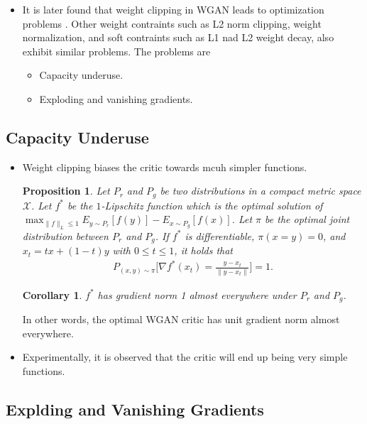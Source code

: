 \documentclass[10pt]{article}
\newtheorem{proposition}[lemma]{Proposition}
\newtheorem{corollary}[lemma]{Corollary}
\begin{document}
  \begin{itemize}
  	\item It is later found that weight clipping in WGAN leads to optimization problems \cite{Gulrajani:2017}. Other weight contraints such as L2 norm clipping, weight normalization, and soft contraints such as L1 nad L2 weight decay, also exhibit similar problems. The problems are
  	\begin{itemize}
		\item Capacity underuse.
		\item Exploding and vanishing gradients.
	\end{itemize}
  \end{itemize}

  \subsection{Capacity Underuse}

  \begin{itemize}
  	\item Weight clipping biases the critic towards mcuh simpler functions.

  	\begin{proposition} \label{unit-gradient}
  		Let $P_r$ and $P_g$ be two distributions in a compact metric space $\mathcal{X}$. Let $f^*$ be the $1$-Lipschitz function which is the optimal solution of $\max_{\| f\|_L \leq 1} E_{y \sim P_r } [f(y)] - E_{x \sim P_g}[f(x)]$. Let $\pi$ be the optimal joint distribution between $P_r$ and $P_g$. If $f^*$ is differentiable, $\pi(x = y) = 0$, and $x_t = tx + (1-t)y$ with $0 \leq t \leq 1$, it holds that
  		\begin{align*}
  			P_{(x,y) \sim \pi} \bigg[ \nabla f^*(x_t) = \frac{y - x_t}{\| y - x_t \|} \bigg] = 1.
  		\end{align*}
  	\end{proposition}

  	\begin{corollary}
  		$f^*$ has gradient norm 1 almost everywhere under $P_r$ and $P_g$.
  	\end{corollary}

  	In other words, the optimal WGAN critic has unit gradient norm almost everywhere.

  	\item Experimentally, it is observed that the critic will end up being very simple functions.  	
  \end{itemize}

  \subsection{Explding and Vanishing Gradients}
\end{document}
